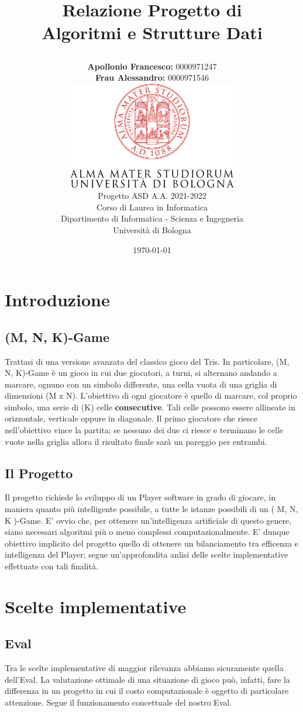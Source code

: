 \documentclass{article}
\title{{\fontsize{31}{30}\sffamily\textbf{Relazione Progetto di \\ Algoritmi e Strutture Dati}}
	\author{
	\large\textbf{Apollonio Francesco:} 0000971247
		    \vspace{1em}\\
	\large\textbf{Frau Alessandro:} 0000971546
	    \vspace{4em}\\
		\includegraphics[width=74mm]{UniBo-Universita-di-Bologna.png}\vspace{4em}\\
		Progetto ASD A.A. 2021-2022\\
		Corso di Laurea in Informatica \\
		Dipartimento di Informatica - Scienza e Ingegneria \\
		Università di Bologna}
	\huge\date{\today}
}
\begin{document}
\maketitle

\newpage
\tableofcontents
\newpage

\section{Introduzione}
\subsection{(M, N, K)-Game}
Trattasi di una versione avanzata del classico gioco del Tris.
In particolare, (M, N, K)-Game è un gioco in cui due giocatori, a turni, si alternano andando a marcare, ognuno con un simbolo differente, una cella vuota di una griglia di dimensioni (M x N).
L'obiettivo di ogni giocatore è quello di marcare, col proprio simbolo, una serie di (K) celle \textbf{consecutive}. Tali celle possono essere allineate in orizzontale, verticale oppure in diagonale.
Il primo giocatore che riesce nell'obiettivo vince la partita; se nessuno dei due ci riesce e terminano le celle vuote nella griglia allora il risultato finale sarà un pareggio per entrambi.

\subsection{Il Progetto}
Il progetto richiede lo sviluppo di un Player software in grado di giocare, in maniera quanto più intelligente possibile, a tutte le istanze possibili di un ( M, N, K )-Game.
E' ovvio che, per ottenere un'intelligenza artificiale di questo genere, siano necessari algoritmi più o meno complessi computazionalmente. 
E' dunque obiettivo implicito del progetto quello di ottenere un bilanciamento tra efficenza e intelligenza del Player; segue un'approfondita anlisi delle scelte implementative effettuate con tali finalità.

\section{Scelte implementative}
\subsection{Eval}
Tra le scelte implementative di maggior rilevanza abbiamo sicuramente quella dell'Eval.
La valutazione ottimale di una situazione di gioco può, infatti, fare la differenza in un progetto in cui il costo computazionale è oggetto di particolare attenzione. Segue il funzionamento concettuale del nostro Eval.
\medskip
\end{document}
